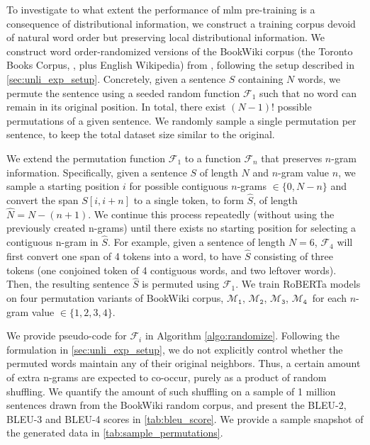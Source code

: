\documentclass[letterpaper, 12pt]{report}
\newcommand{\RI}{$\mathcal{M}_{\texttt{1}}$}
\newcommand{\RII}{$\mathcal{M}_{\texttt{2}}$}
\newcommand{\RIII}{$\mathcal{M}_{\texttt{3}}$}
\newcommand{\RIV}{$\mathcal{M}_{\texttt{4}}$}
\begin{document}
To investigate to what extent the performance of \acrshort{mlm} pre-training is a consequence of distributional information, we construct a training corpus devoid of natural word order but preserving local distributional information. We construct word order-randomized versions of the BookWiki corpus (the Toronto Books Corpus, \citealt{zhu2015aligning}, plus English Wikipedia) from \citet{liu2019b}, following the setup described in \autoref{sec:unli_exp_setup}. %
Concretely, given a sentence $S$ containing $N$ words, we permute the sentence using a seeded random function $\mathcal{F}_1$ such that no word can remain in its original position. In total, there exist $(N-1)!$ possible permutations of a given sentence. We randomly sample a single permutation per sentence, to keep the total dataset size similar to the original.

We extend the permutation function $\mathcal{F}_1$ to a function $\mathcal{F}_n$ that preserves $n$-gram information. Specifically, given a sentence $S$ of length $N$ and $n$-gram value $n$, we sample a starting position $i$ for possible contiguous $n$-grams $\in \{0, N-n\}$ and convert the span $S[i,i+n]$ to a single token, to form $\hat{S}$, of length $\hat{N} = N - (n+1)$. We continue this process repeatedly (without using the previously created n-grams) until there exists no starting position for selecting a contiguous n-gram in $\hat{S}$. For example, given a sentence of length $N=6$, $\mathcal{F}_4$ will first convert one span of 4 tokens into a word, to have $\hat{S}$ consisting of three tokens (one conjoined token of 4 contiguous words, and two leftover words).
Then, the resulting sentence $\hat{S}$ is permuted using $\mathcal{F}_1$. We train RoBERTa models on four permutation variants of BookWiki corpus, \RI, \RII, \RIII, \RIV\ for each $n$-gram value $ \in {\{1,2,3,4\}}$.

We provide pseudo-code for $\mathcal{F}_i$ in Algorithm \autoref{algo:randomize}.
Following the formulation in \autoref{sec:unli_exp_setup}, we do not explicitly control whether the permuted words maintain any of their original neighbors. Thus, a certain amount of extra n-grams are expected to co-occur, purely as a product of random shuffling. We quantify the amount of such shuffling on a sample of 1 million sentences drawn from the BookWiki random corpus, and present the BLEU-2, BLEU-3 and BLEU-4 scores in \autoref{tab:bleu_score}. We provide a sample snapshot of the generated data in \autoref{tab:sample_permutations}.
\end{document}
